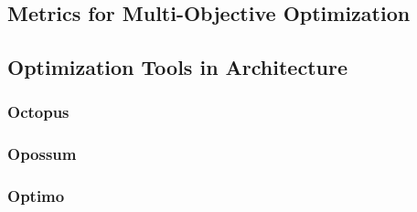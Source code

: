 \subsection{Metrics for Multi-Objective Optimization}

\subsection{Optimization Tools in Architecture}

\subsubsection{Octopus}
\subsubsection{Opossum}
\subsubsection{Optimo}

